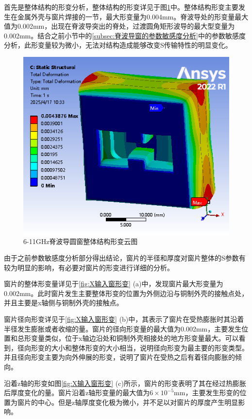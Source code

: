 \documentclass[master]{thesis-uestc}
\begin{document}
首先是整体结构的形变分析，整体结构的形变详见于图\ref{fig:X整体结构形变}中。整体结构形变主要发生在金属外壳与窗片焊接的一节，最大形变量为0.004mm。脊波导处的形变量最大值为0.002mm，出现在脊波导突出的脊处，过渡圆角矩形波导的最大型变量为0.002mm。结合之前小节中的\ref{subsec:脊波导窗的参数敏感度分析}中的参数敏感度分析，此形变量较为微小，无法对结构造成能够改变S传输特性的明显变化。
\begin{figure}[!htb]
    \centering
    \includegraphics[width=0.45\linewidth]{pic/chapter3/X输入窗与波导.png}
    \caption{6-11GHz脊波导圆窗整体结构形变云图}
    \label{fig:X整体结构形变}
\end{figure}

由于之前参数敏感度分析部分得出结论，窗片的半径和厚度对窗片整体的S参数有较为明显的影响，有必要对窗片的形变进行详细的分析。

窗片的整体形变量详见于\ref{fig:X输入窗形变} (a)中，发现窗片最大形变量为0.002mm。此时窗片发生主要整体形变的位置为外侧边沿与铜制外壳的接触点处，并且主要是x轴侧与铜制外壳的接触点。

窗片径向形变详见于\ref{fig:X输入窗形变} (b)中，其表示了窗片在受热膨胀时其沿着半径发生膨胀或者收缩的量。窗片的径向形变量的最大值为0.002mm，主要发生位置和总形变量类似，位于x轴边沿处和铜制外壳相接处的地方形变量最大。可以看到，径向形变的大小和整体形变的大小相当，说明径向形变为最主要的形变类型。并且径向形变主要为向外伸展的形变，说明了窗片在受热之后有着径向膨胀的倾向。

沿着z轴的形变如图\ref{fig:X输入窗形变} (c)所示，窗片的形变表明了其在经过热膨胀后厚度变化的量。窗片沿着z轴形变量的最大值为\(6 \times 10^{-5}\)mm，主要发生形变的位置为窗片的中心。但是z轴厚度变化极为微小，并不足以对窗片的厚度产生明显影响。
\end{document}
